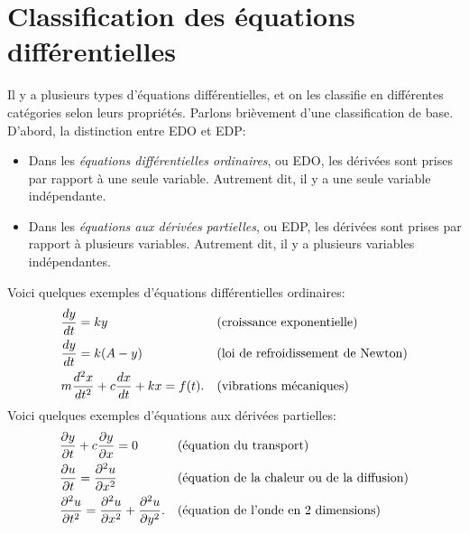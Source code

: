 \sectionnewpage
\section{Classification des équations différentielles}
\label{classification:section}

Il y a plusieurs types d'équations différentielles, et on les classifie en différentes catégories selon leurs propriétés.  
Parlons brièvement d'une classification de base.  D'abord, la distinction entre EDO et EDP:
\begin{itemize}
\item
	Dans les \emph{équations différentielles ordinaires}, ou EDO, 
	les dérivées sont prises par rapport à une seule variable.  Autrement dit, il y a une seule variable indépendante.

\item
	Dans les \emph{équations aux dérivées partielles}, ou EDP, 
	les dérivées sont prises par rapport à plusieurs variables.  Autrement dit, il y a plusieurs variables indépendantes.
\end{itemize}

Voici quelques exemples d'équations différentielles ordinaires:
\begin{align*}
	& \frac{d y}{dt} = ky  & & \text{(croissance exponentielle\index{exponential growth})} \\
	& \frac{d y}{dt} = k(A-y)  & & \text{(\myindex{loi de refroidissement de Newton})} \\
	& m \frac{d^2 x}{dt^2} + c \frac{dx}{dt} + kx = f(t) . & &
\text{(vibrations mécaniques\index{mechanical vibrations})}
\end{align*}
Voici quelques exemples d'équations aux dérivées partielles:
\begin{align*}
	& \frac{\partial y}{\partial t} + c \frac{\partial y}{\partial x} = 0 & & 
		\text{(équation du transport\index{Équation du transport})} \\
	& \frac{\partial u}{\partial t} = \frac{\partial^2 u}{\partial x^2}  & & 
		\text{(équation de la chaleur ou de la diffusion\index{Équation de la chaleur/diffusion})} \\
	& \frac{\partial^2 u}{\partial t^2} = \frac{\partial^2 u}{\partial x^2} + \frac{\partial^2 u}{\partial y^2} . & & 
		\text{(équation de l'onde en 2 dimensions\index{Équation de l'onde en deux dimensions})}
\end{align*}

